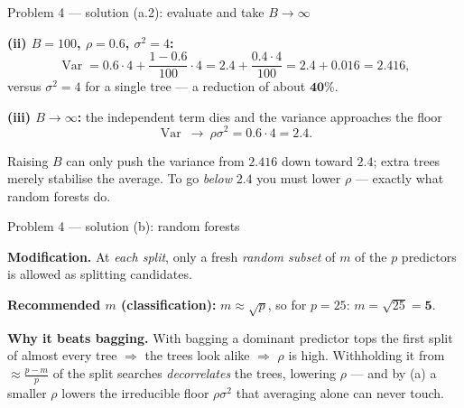 \documentclass[aspectratio=169,11pt]{beamer}
\begin{document}
\begin{frame}{Problem 4 --- solution (a.2): evaluate and take $B\to\infty$}
  \begin{solutionbox}
    \textbf{(ii) $B=100$, $\rho=0.6$, $\sigma^2=4$:}
    \[
      \operatorname{Var}=0.6\cdot4+\frac{1-0.6}{100}\cdot4
      =2.4+\frac{0.4\cdot4}{100}=2.4+0.016=\mathbf{2.416},
    \]
    versus $\sigma^2=4$ for a single tree --- a reduction of about $\mathbf{40\%}$.
    \medskip

    \textbf{(iii) $B\to\infty$:} the independent term dies and the variance approaches the floor
    \[
      \operatorname{Var}\ \longrightarrow\ \rho\sigma^2=0.6\cdot4=\mathbf{2.4}.
    \]
  \end{solutionbox}
  \begin{takeaway}
    \footnotesize Raising $B$ can only push the variance from $2.416$ down toward $2.4$; extra
    trees merely stabilise the average. To go \emph{below} $2.4$ you must lower $\rho$ --- exactly
    what random forests do.
  \end{takeaway}
\end{frame}

\begin{frame}{Problem 4 --- solution (b): random forests}
  \begin{solutionbox}
    \textbf{Modification.} At \emph{each split}, only a fresh \emph{random subset} of $m$ of the
    $p$ predictors is allowed as splitting candidates.
    \medskip

    \textbf{Recommended $m$ (classification):} $m\approx\sqrt p$, so for $p=25$:
    $m=\sqrt{25}=\mathbf{5}$.
    \medskip

    \textbf{Why it beats bagging.} With bagging a dominant predictor tops the first split of
    almost every tree $\Rightarrow$ the trees look alike $\Rightarrow$ $\rho$ is high. Withholding
    it from $\approx\tfrac{p-m}{p}$ of the split searches \emph{decorrelates} the trees, lowering
    $\rho$ --- and by (a) a smaller $\rho$ lowers the irreducible floor $\rho\sigma^2$ that
    averaging alone can never touch.
  \end{solutionbox}
\end{frame}
\end{document}
